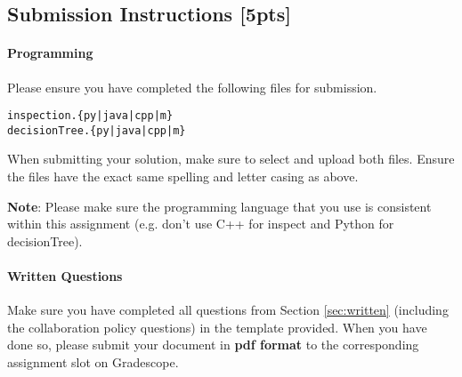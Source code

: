 \subsection{Submission Instructions [5pts]}

\paragraph{Programming}
Please ensure you have completed the following files for submission.


\begin{verbatim}
inspection.{py|java|cpp|m}
decisionTree.{py|java|cpp|m}
\end{verbatim}

When submitting your solution, make sure to select and upload both files. Ensure the files have the exact same spelling and letter casing as above.


\textbf{Note}: Please make sure the programming language that you use is consistent within this assignment (e.g. don't use C++ for inspect and Python for decisionTree).

\paragraph{Written Questions}
Make sure you have completed all questions from Section \ref{sec:written} (including the collaboration policy questions) in the template provided.  When you have done so, please submit your document in \textbf{pdf format} to the corresponding assignment slot on Gradescope.



